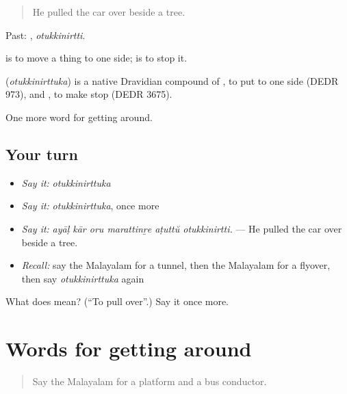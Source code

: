 \begin{quote}
He pulled the car over beside a tree.
\end{quote}

Past: , \emph{otukkinirtti}.

 is to move a thing to one side;  is to stop it.

\begin{cousinweb}
\textbf{} (\emph{otukkinirttuka}) is a native Dravidian compound of , to put to one side (DEDR 973), and , to make stop (DEDR 3675).
\end{cousinweb}

\begin{grammarlens}[title={What you've built}]
One more word for getting around.
\end{grammarlens}

\subsection*{Your turn}
\begin{itemize}
\raggedright
  \item \emph{Say it:} \emph{otukkinirttuka}
  \item \emph{Say it:} \emph{otukkinirttuka}, once more
  \item \emph{Say it:} \emph{ayāḷ kār oru marattinṟe aṭuttŭ otukkinirtti.} — He pulled the car over beside a tree.
  \item \emph{Recall:} say the Malayalam for a tunnel, then the Malayalam for a flyover, then say \emph{otukkinirttuka} again
\end{itemize}

\begin{tcolorbox}[breakable,colback=teal!4,colframe=teal!35!black,title={Before you move on}]
What does  mean? (\textquotedblleft{}To pull over\textquotedblright{}.) Say it once more.
\end{tcolorbox}
\section[(dialogue)]{Words for getting around}

\label{lesson:ML-R468-review-461-468}



\begin{quote}
Say the Malayalam for a platform and a bus conductor.
\end{quote}

